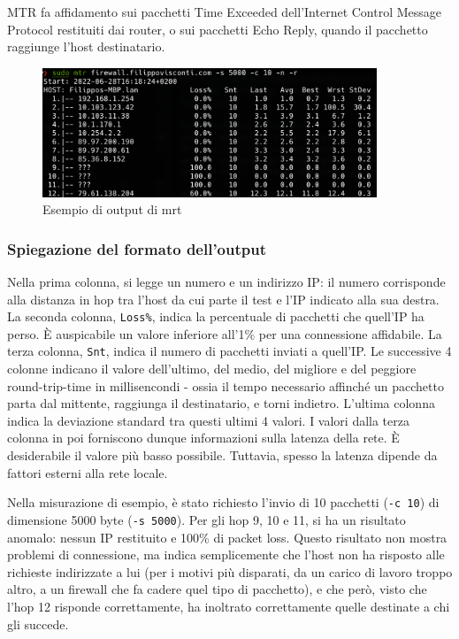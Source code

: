 MTR fa affidamento sui pacchetti Time Exceeded dell'Internet Control Message Protocol restituiti dai router, o sui pacchetti Echo Reply, quando il pacchetto raggiunge l'host destinatario.

\begin{figure}[ht]
    \centering
    \includegraphics[width=10cm]{figure/mtrSample.png}
    \caption{Esempio di output di mrt}
\end{figure}

\subsubsection{Spiegazione del formato dell'output}
Nella prima colonna, si legge un numero e un indirizzo IP: il numero corrisponde alla distanza in hop tra l'host da cui parte il test e l'IP indicato alla sua destra.
La seconda colonna, \texttt{Loss\%}, indica la percentuale di pacchetti che quell'IP ha perso. È auspicabile un valore inferiore all'1\% per una connessione affidabile.
La terza colonna, \texttt{Snt}, indica il numero di pacchetti inviati a quell'IP.
Le successive 4 colonne indicano il valore dell'ultimo, del medio, del migliore e del peggiore round-trip-time in millisencondi - ossia il tempo necessario affinché un pacchetto parta dal mittente, raggiunga il destinatario, e torni indietro.
L'ultima colonna indica la deviazione standard tra questi ultimi 4 valori.
I valori dalla terza colonna in poi forniscono dunque informazioni sulla latenza della rete. È desiderabile il valore più basso possibile. Tuttavia,  spesso la latenza dipende da fattori esterni alla rete locale.

Nella misurazione di esempio, è stato richiesto l'invio di 10 pacchetti (\texttt{-c 10}) di dimensione 5000 byte (\texttt{-s 5000}).
Per gli hop 9, 10 e 11, si ha un risultato anomalo: nessun IP restituito e 100\% di packet loss.
Questo risultato non mostra problemi di connessione, ma indica semplicemente che l'host non ha risposto alle richieste indirizzate a lui (per i motivi più disparati, da un carico di lavoro troppo altro, a un firewall che fa cadere quel tipo di pacchetto), e che però, visto che l'hop 12 risponde correttamente, ha inoltrato correttamente quelle destinate a chi gli succede.

